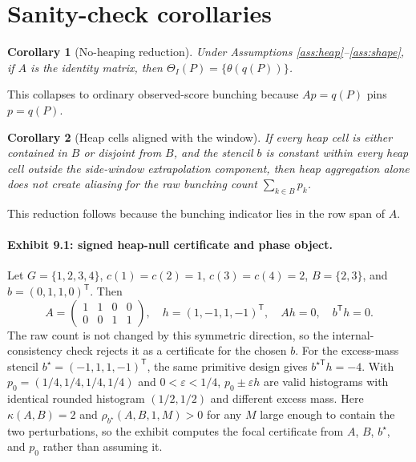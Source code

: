 \documentclass[11pt]{article}
\newcommand{\transpose}{\mathsf{T}}
\theoremstyle{definition}
\theoremstyle{plain}
\newtheorem{corollary}{Corollary}
\theoremstyle{remark}
\begin{document}
\section{Sanity-check corollaries}
\begin{corollary}[No-heaping reduction]\label{cor:noheap}
Under Assumptions \ref{ass:heap}--\ref{ass:shape}, if $A$ is the identity matrix, then $\Theta_I(P)=\{\theta(q(P))\}$.
\end{corollary}
This collapses to ordinary observed-score bunching because $Ap=q(P)$ pins $p=q(P)$.

\begin{corollary}[Heap cells aligned with the window]\label{cor:aligned}
If every heap cell is either contained in $B$ or disjoint from $B$, and the stencil $b$ is constant within every heap cell outside the side-window extrapolation component, then heap aggregation alone does not create aliasing for the raw bunching count $\sum_{k\in B}p_k$.
\end{corollary}
This reduction follows because the bunching indicator lies in the row span of $A$.

\paragraph{Exhibit 9.1: signed heap-null certificate and phase object.}
Let $G=\{1,2,3,4\}$, $c(1)=c(2)=1$, $c(3)=c(4)=2$, $B=\{2,3\}$, and $b=(0,1,1,0)^\transpose$. Then
\[
  A=\begin{pmatrix}1&1&0&0\\0&0&1&1\end{pmatrix},\quad
  h=(1,-1,1,-1)^\transpose,\quad Ah=0,\quad b^\transpose h=0.
\]
The raw count is not changed by this symmetric direction, so the internal-consistency check rejects it as a certificate for the chosen $b$. For the excess-mass stencil $b^\star=(-1,1,1,-1)^\transpose$, the same primitive design gives $b^{\star\transpose}h=-4$. With $p_0=(1/4,1/4,1/4,1/4)$ and $0<\varepsilon<1/4$, $p_0\pm\varepsilon h$ are valid histograms with identical rounded histogram $(1/2,1/2)$ and different excess mass. Here $\kappa(A,B)=2$ and $\rho_{b^\star}(A,B,1,M)>0$ for any $M$ large enough to contain the two perturbations, so the exhibit computes the focal certificate from $A$, $B$, $b^\star$, and $p_0$ rather than assuming it.
\end{document}
